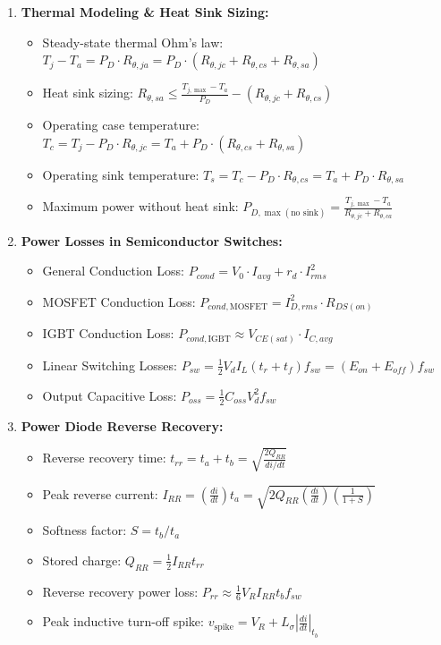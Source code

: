 \documentclass[11pt,a4paper]{article}
\begin{document}
\begin{formulabox}
\small
\begin{enumerate}[leftmargin=*,itemsep=1.5pt,topsep=1pt,parsep=0pt]
  \item \textbf{Thermal Modeling \& Heat Sink Sizing:}
  \begin{itemize}
    \item Steady-state thermal Ohm's law: $T_j - T_a = P_D \cdot R_{\theta,ja} = P_D \cdot (R_{\theta,jc} + R_{\theta,cs} + R_{\theta,sa})$
    \item Heat sink sizing: $R_{\theta,sa} \le \frac{T_{j,\max} - T_a}{P_D} - (R_{\theta,jc} + R_{\theta,cs})$
    \item Operating case temperature: $T_c = T_j - P_D \cdot R_{\theta,jc} = T_a + P_D \cdot (R_{\theta,cs} + R_{\theta,sa})$
    \item Operating sink temperature: $T_s = T_c - P_D \cdot R_{\theta,cs} = T_a + P_D \cdot R_{\theta,sa}$
    \item Maximum power without heat sink: $P_{D,\max(\text{no sink})} = \frac{T_{j,\max} - T_a}{R_{\theta,jc} + R_{\theta,ca}}$
  \end{itemize}

  \item \textbf{Power Losses in Semiconductor Switches:}
  \begin{itemize}
    \item General Conduction Loss: $P_{cond} = V_0 \cdot I_{avg} + r_d \cdot I_{rms}^2$
    \item MOSFET Conduction Loss: $P_{cond,\text{MOSFET}} = I_{D,rms}^2 \cdot R_{DS(on)}$
    \item IGBT Conduction Loss: $P_{cond,\text{IGBT}} \approx V_{CE(sat)} \cdot I_{C,avg}$
    \item Linear Switching Losses: $P_{sw} = \frac{1}{2} V_d I_L (t_r + t_f) f_{sw} = (E_{on} + E_{off}) f_{sw}$
    \item Output Capacitive Loss: $P_{oss} = \frac{1}{2} C_{oss} V_d^2 f_{sw}$
  \end{itemize}

  \item \textbf{Power Diode Reverse Recovery:}
  \begin{itemize}
    \item Reverse recovery time: $t_{rr} = t_a + t_b = \sqrt{\frac{2 Q_{RR}}{di/dt}}$
    \item Peak reverse current: $I_{RR} = \left(\frac{di}{dt}\right) t_a = \sqrt{2 Q_{RR} \left(\frac{di}{dt}\right) \left(\frac{1}{1+S}\right)}$
    \item Softness factor: $S = t_b / t_a$
    \item Stored charge: $Q_{RR} = \frac{1}{2} I_{RR} t_{rr}$
    \item Reverse recovery power loss: $P_{rr} \approx \frac{1}{6} V_R I_{RR} t_b f_{sw}$
    \item Peak inductive turn-off spike: $v_{\text{spike}} = V_R + L_{\sigma} \left|\frac{di}{dt}\right|_{t_b}$
  \end{itemize}


\end{enumerate}
\end{formulabox}
\end{document}
